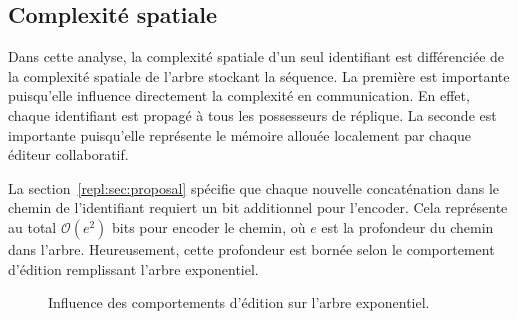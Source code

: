 \subsection{Complexité spatiale}
\label{repl:subsec:space}

Dans cette analyse, la complexité spatiale d'un seul identifiant est
différenciée de la complexité spatiale de l'arbre stockant la séquence. La
première est importante puisqu'elle influence directement la complexité en
communication. En effet, chaque identifiant est propagé à tous les possesseurs
de réplique. La seconde est importante puisqu'elle représente le mémoire allouée
localement par chaque éditeur collaboratif.

La section~\ref{repl:sec:proposal} spécifie que chaque nouvelle concaténation
dans le chemin de l'identifiant requiert un bit additionnel pour l'encoder. Cela
représente au total $\mathcal{O}(e^2)$ bits pour encoder le chemin, où $e$ est
la profondeur du chemin dans l'arbre. Heureusement, cette profondeur est bornée
selon le comportement d'édition remplissant l'arbre exponentiel. 

\begin{figure}
  \begin{center}
    \hspace{10pt}
    \hspace{10pt}
    \caption[Influence des comportements d'édition sur l'arbre exponentiel]
    {Influence des comportements d'édition sur l'arbre exponentiel.}
  \end{center}
\end{figure}


